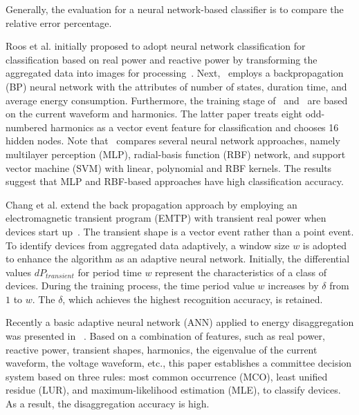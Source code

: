 Generally, the evaluation for a neural network-based classifier is 
to compare the relative error percentage.

Roos et al. initially proposed to adopt
neural network classification for classification based on real
power and reactive power by 
transforming the aggregated data into images for processing~\cite{roos1994using}.
Next,~\cite{baranski2003nonintrusive} employs a backpropagation (BP)
neural network with the attributes of number of states,
duration time, and average energy consumption. %
Furthermore, 
the training stage of~\cite{duan2004neural} and~\cite{srinivasan2006neural} are based on the current waveform
and harmonics. %
The latter paper treats eight odd-numbered harmonics as a vector event feature 
for classification and chooses 16 hidden nodes.
Note that~\cite{srinivasan2006neural} compares several neural network approaches, 
namely multilayer perception (MLP), radial-basis function (RBF) network,
and support vector machine (SVM) with linear, polynomial and
RBF kernels.
The results suggest that MLP and RBF-based approaches have high classification accuracy. 

Chang et al. extend the back propagation approach
by employing an electromagnetic transient program (EMTP) with
transient real power when devices start up~\cite{chang2008load2}. 
The transient shape is a vector event rather than a point event. 
To identify devices from aggregated data adaptively,
a window size %
$w$
is adopted to enhance the algorithm
as an adaptive neural network. 
Initially, the differential values $dP_{transient}$ for period time %
$w$
represent the characteristics of a class of devices. During the training process,
the time period value %
$w$ increases by $\delta$ from $1$ to %
$w$.
The $\delta$, which achieves the highest recognition accuracy, is retained.

Recently a basic adaptive neural network (ANN) applied to energy disaggregation was presented in ~\cite{liang2010load}. 
Based on a combination of features,
such as real power, reactive power,
transient shapes, harmonics, the eigenvalue of the current waveform,
the voltage waveform, etc., 
this paper establishes a committee decision system based on 
three rules: most common occurrence (MCO), least unified residue (LUR), and
maximum-likelihood estimation (MLE), to classify devices. 
As a result, the disaggregation accuracy is high. 

